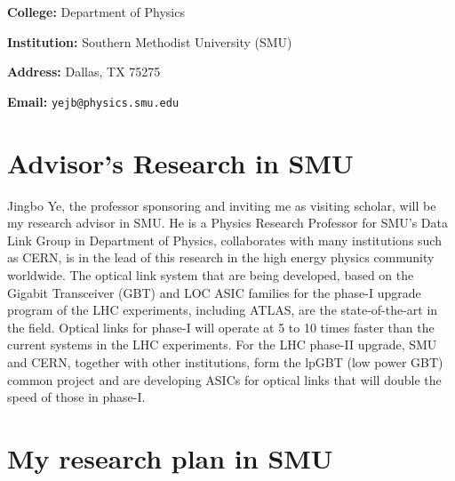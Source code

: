 \documentclass[11pt,a4paper]{article}
\begin{document}
\begin{spacing}{1.25}
\begin{multicols}{2}
\textbf{College:} Department of Physics

\textbf{Institution:} Southern Methodist University (SMU)

\textbf{Address:} Dallas, TX 75275 
 
\textbf{Email:} \texttt{yejb@physics.smu.edu} 

\end{multicols}

\section*{Advisor's Research in SMU}     %
Jingbo Ye, the professor sponsoring and inviting me as visiting scholar, will be my research advisor in SMU. He is a Physics Research Professor for SMU's Data Link Group in Department of Physics, collaborates with many institutions such as CERN, is in the lead of this research in the high energy physics community worldwide. The optical link system that are being developed, based on the Gigabit Transceiver (GBT) and LOC ASIC families for the phase-I upgrade program of the LHC experiments, including ATLAS, are the state-of-the-art in the field. Optical links for phase-I will operate at 5 to 10 times faster than the current systems in the LHC experiments. For the LHC phase-II upgrade, SMU and CERN, together with other institutions, form the lpGBT (low power GBT) common project and are developing ASICs for optical links that will double the speed of those in phase-I.

\section*{My research plan in SMU}     %
\end{spacing}
\end{document}
